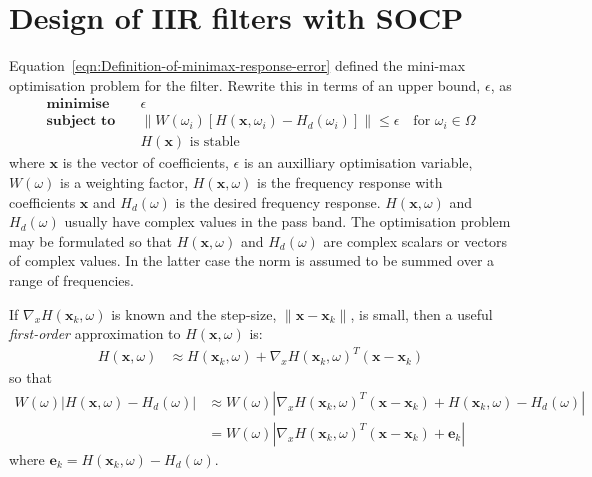 \documentclass[a4paper,twoside,10pt,english]{report}
\begin{document}
\section{Design of IIR filters with SOCP}
Equation~\ref{eqn:Definition-of-minimax-response-error} defined the mini-max
optimisation problem for the filter. Rewrite this in terms of an upper bound, 
$\epsilon$, as
\begin{align*}
\textbf{minimise}\quad & \epsilon \\
\textbf{subject to}\quad &\|W\left(\omega_{i}\right)\left[H\left(\boldsymbol{x},
\omega_{i} \right) -H_{d} \left(\omega_{i}\right)\right]\| \le 
\epsilon \quad \text{for } \omega_{i} \in \Omega \\
&H\left(\boldsymbol{x}\right) \text{ is stable} 
\end{align*}
where $\boldsymbol{x}$ is the vector of coefficients,
$\epsilon$ is an auxilliary optimisation variable, $W\left(\omega\right)$
is a weighting factor, $H\left(\boldsymbol{x},\omega\right)$ is the frequency
response with coefficients $\boldsymbol{x}$ and $H_{d}\left(\omega\right)$ is
the desired frequency response. $H\left(\boldsymbol{x},\omega\right)$ and 
$H_{d}\left(\omega\right)$ usually have complex values in the pass band. The 
optimisation problem may be formulated so that 
$H\left(\boldsymbol{x},\omega\right)$ and $H_{d}\left(\omega\right)$ are
complex scalars or vectors of complex values. In the latter case the norm is 
assumed to be summed over a range of frequencies.

If $\nabla_{x}H\left(\boldsymbol{x}_{k},\omega\right)$ is known and the step-size,
$\|\boldsymbol{x}-\boldsymbol{x}_{k}\|$, is small, then a useful
\emph{first-order} approximation to $H\left(\boldsymbol{x},\omega\right)$ is:
\begin{align*}
H\left(\boldsymbol{x},\omega\right) &\approx 
H\left(\boldsymbol{x}_{k},\omega\right) + 
\nabla_{x}H\left(\boldsymbol{x}_{k},\omega\right)^{T}
\left(\boldsymbol{x}-\boldsymbol{x}_{k}\right)
\end{align*}
so that
\begin{align*}
W\left(\omega\right)\left|H\left(\boldsymbol{x},\omega\right)-H_{d}\left(\omega\right)\right| &\approx W\left(\omega\right)\left|
\nabla_{x}H\left(\boldsymbol{x}_{k},\omega\right)^{T}
\left(\boldsymbol{x}-\boldsymbol{x}_{k}\right) +
H\left(\boldsymbol{x}_{k},\omega\right)-H_{d}\left(\omega\right)\right| \\
&= W\left(\omega\right)\left|\nabla_{x}H\left(\boldsymbol{x}_{k},\omega\right)^{T}
\left(\boldsymbol{x}-\boldsymbol{x}_{k}\right) + \boldsymbol{e}_{k}\right|
\end{align*}
where $\boldsymbol{e}_{k}=H\left(\boldsymbol{x}_{k},\omega\right)-
H_{d}\left(\omega\right)$.
\end{document}
